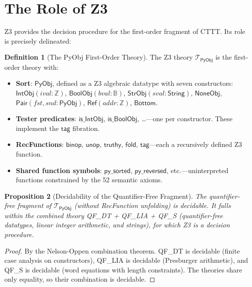 \documentclass[11pt,a4paper]{report}
\theoremstyle{definition}
\newtheorem{definition}{Definition}[chapter]
\theoremstyle{plain}
\newtheorem{proposition}[definition]{Proposition}
\newcommand{\Int}{\mathbb{Z}}
\newcommand{\Bool}{\mathbb{B}}
\newcommand{\PyObj}{\mathsf{PyObj}}
\begin{document}
\section{The Role of Z3}

Z3 provides the decision procedure for the first-order fragment of
CTTT.  Its role is precisely delineated:

\begin{definition}[The PyObj First-Order Theory]
\label{def:pyobj-theory}
The Z3 theory $\mathcal{T}_{\PyObj}$ is the first-order theory with:
\begin{itemize}
  \item \textbf{Sort}: $\PyObj$, defined as a Z3 algebraic datatype
    with seven constructors: $\mathsf{IntObj}(\mathit{ival} : \Int)$,
    $\mathsf{BoolObj}(\mathit{bval} : \Bool)$,
    $\mathsf{StrObj}(\mathit{sval} : \mathsf{String})$,
    $\mathsf{NoneObj}$, $\mathsf{Pair}(\mathit{fst}, \mathit{snd} : \PyObj)$,
    $\mathsf{Ref}(\mathit{addr} : \Int)$, $\mathsf{Bottom}$.
  \item \textbf{Tester predicates}: $\mathsf{is\_IntObj}$,
    $\mathsf{is\_BoolObj}$, \ldots---one per constructor.  These
    implement the $\mathsf{tag}$ fibration.
  \item \textbf{RecFunctions}: $\mathsf{binop}$, $\mathsf{unop}$,
    $\mathsf{truthy}$, $\mathsf{fold}$, $\mathsf{tag}$---each a
    recursively defined Z3 function.
  \item \textbf{Shared function symbols}: $\mathsf{py\_sorted}$,
    $\mathsf{py\_reversed}$, etc.---uninterpreted functions constrained
    by the 52 semantic axioms.
\end{itemize}
\end{definition}

\begin{proposition}[Decidability of the Quantifier-Free Fragment]
\label{prop:qf-decidable}
The quantifier-free fragment of $\mathcal{T}_{\PyObj}$ (without
RecFunction unfolding) is decidable.  It falls within the combined
theory QF\_DT + QF\_LIA + QF\_S (quantifier-free datatypes, linear
integer arithmetic, and strings), for which Z3 is a decision procedure.
\end{proposition}

\begin{proof}
By the Nelson-Oppen combination theorem.  QF\_DT is decidable
(finite case analysis on constructors), QF\_LIA is decidable
(Presburger arithmetic), and QF\_S is decidable (word equations
with length constraints).  The theories share only equality, so
their combination is decidable.
\end{proof}
\end{document}
